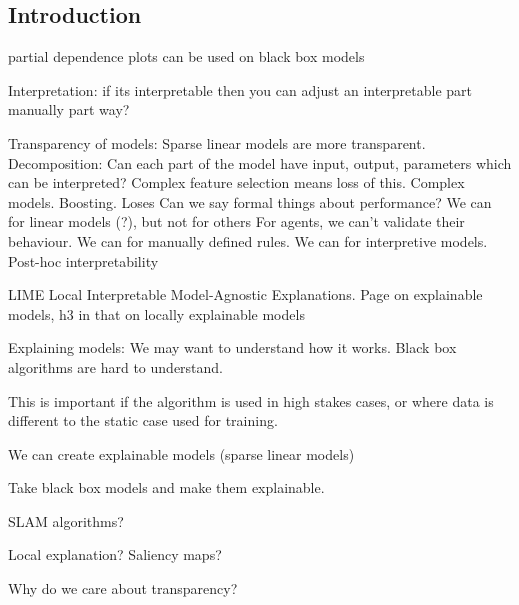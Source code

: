 
\subsection{Introduction}

partial dependence plots can be used on black box models


Interpretation: if its interpretable then you can adjust an interpretable part manually part way?

Transparency of models:
Sparse linear models are more transparent.
Decomposition: Can each part of the model have input, output, parameters which can be interpreted?
Complex feature selection means loss of this. Complex models. Boosting. Loses
Can we say formal things about performance? We can for linear models (?), but not for others
For agents, we can't validate their behaviour. We can for manually defined rules. We can for interpretive  models.
Post-hoc interpretability

LIME Local Interpretable Model-Agnostic Explanations. Page on explainable models, h3 in that on locally explainable models

Explaining models: We may want to understand how it works. Black box algorithms are hard to understand.

This is important if the algorithm is used in high stakes cases, or where data is different to the static case used for training.

We can create explainable models (sparse linear models)

Take black box models and make them explainable.

SLAM algorithms?

Local explanation? Saliency maps?

Why do we care about transparency?
